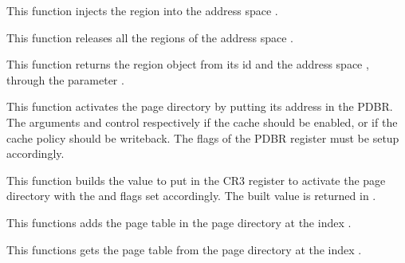 {
  This function injects the region  into the address space
  . 
}

{
  This function releases all the regions of the address space .
}

{
  This function returns the region object from its id  and the
  address space , through the parameter .
}

{
  This function activates the page directory  by putting its
  address in the PDBR. The arguments  and 
  control respectively if the cache should be enabled, or if the cache policy
  should be writeback. The flags of the PDBR register must be setup accordingly.
  
}

{
  This function builds the value to put in the CR3 register to activate the page
  directory  with the  and  flags
  set accordingly. The built value is returned in .
}

{
  This functions adds the page table  in the page directory
   at the index .
}

{
  This functions gets the page table  from the page directory
   at the index .
}


